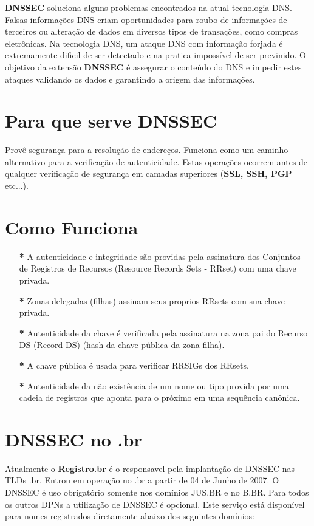 \documentclass[12pt, a4paper]{abnt}
\begin{document}
\textbf{DNSSEC} soluciona alguns problemas encontrados na atual tecnologia DNS. Falsas informações DNS criam oportunidades para roubo de informações de terceiros ou alteração de dados em diversos tipos de transações, como compras eletrônicas. Na tecnologia DNS, um ataque DNS com informação forjada é extremamente dificil de ser detectado e na pratica impossível de ser previnido. O objetivo da extensão \textbf{DNSSEC} é assegurar o conteúdo do DNS e impedir estes ataques validando os dados e garantindo a origem das informações.

\section{Para que serve DNSSEC}
Provê segurança para a resolução de endereços. Funciona como um caminho alternativo para a verificação de autenticidade. Estas operações ocorrem antes de qualquer verificação de segurança em camadas superiores (\textbf{SSL, SSH, PGP} etc...).

\section{Como Funciona}
\begin{enumerate}
\item[\textbf{*}] A autenticidade e integridade são providas pela assinatura dos Conjuntos de Registros de Recursos (Resource Records Sets - RRset) com uma chave privada.

\item[\textbf{*}] Zonas delegadas (filhas) assinam seus proprios RRsets com sua chave privada.

\item[\textbf{*}] Autenticidade da chave é verificada pela assinatura na zona pai do Recurso DS (Record DS) (hash da chave pública da zona filha).

\item[\textbf{*}] A chave pública é usada para verificar RRSIGs dos RRsets.

\item[\textbf{*}] Autenticidade da não existência de um nome ou tipo provida por uma cadeia de registros que aponta para o próximo em uma sequência canônica.
\end{enumerate}

\section{DNSSEC no .br}
Atualmente o \textbf{Registro.br} é o responsavel pela implantação de DNSSEC nas TLDs .br.
Entrou em operação no .br a partir de 04 de Junho de 2007. O DNSSEC é uso obrigatório somente nos domínios JUS.BR e no B.BR. Para todos os outros DPNs a utilização de DNSSEC é opcional.
Este serviço está disponível para nomes registrados diretamente abaixo dos seguintes domínios:
\end{document}
